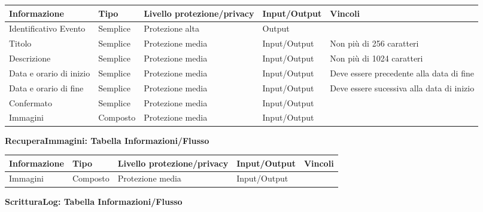 \begin{tabular} {|P{3cm}|P{3cm}|P{3cm}|P{3cm}|P{3cm}|}
    \hline
    \textbf{Informazione}   & \textbf{Tipo} & \textbf{Livello protezione/privacy} & \textbf{Input/Output} & \textbf{Vincoli}                          \\
    \hline
    Identificativo Evento   & Semplice      & Protezione alta                     & Output                &                                           \\
    \hline
    Titolo                  & Semplice      & Protezione media                    & Input/Output          & Non più di 256 caratteri                  \\
    \hline
    Descrizione             & Semplice      & Protezione media                    & Input/Output          & Non più di 1024 caratteri                 \\
    \hline
    Data e orario di inizio & Semplice      & Protezione media                    & Input/Output          & Deve essere precedente alla data di fine  \\
    \hline
    Data e orario di fine   & Semplice      & Protezione media                    & Input/Output          & Deve essere sucessiva alla data di inizio \\
    \hline
    Confermato              & Semplice      & Protezione media                    & Input/Output          &                                           \\
    \hline
    Immagini                & Composto      & Protezione media                    & Input/Output          &                                           \\
    \hline
\end{tabular}
\hfill \break

\textbf{RecuperaImmagini: Tabella Informazioni/Flusso}
\hfill \break

\begin{tabular} {|P{3cm}|P{3cm}|P{3cm}|P{3cm}|P{3cm}|}
    \hline
    \textbf{Informazione} & \textbf{Tipo} & \textbf{Livello protezione/privacy} & \textbf{Input/Output} & \textbf{Vincoli} \\
    \hline
    Immagini              & Composto      & Protezione media                    & Input/Output          &                  \\
    \hline
\end{tabular}
\hfill \break

\textbf{ScritturaLog: Tabella Informazioni/Flusso}
\hfill \break

